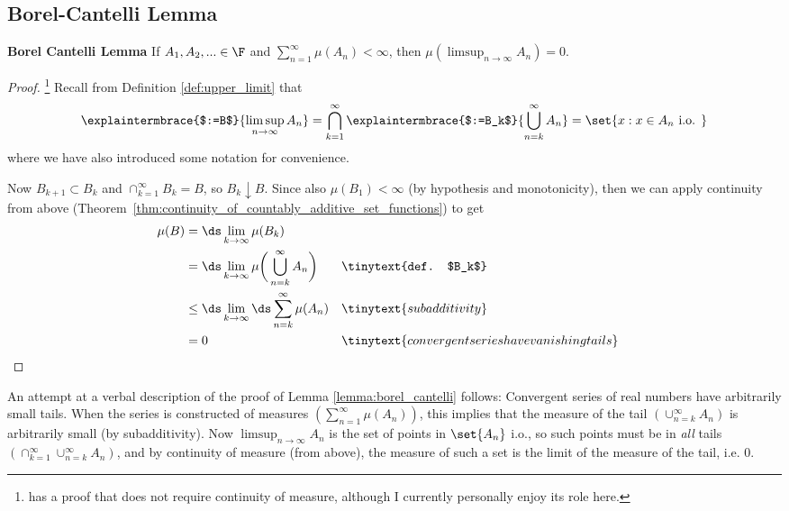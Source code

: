 \documentclass{article} %
\begin{document}
\subsection{Borel-Cantelli Lemma}

\begin{lemma}{\textbf{Borel Cantelli Lemma}}
If $A_1, A_2, ... \in \F$ and $\sum_{n=1}^\infty \mu(A_n) < \infty$, then $\mu(\limsup_{n \to \infty} A_n) = 0$.
\label{lemma:borel_cantelli}
\end{lemma}

\begin{proof}\footnote{\cite{ash2000probability} has a proof that does not require continuity of measure, although I currently personally enjoy its role here.}
Recall from Definition \ref{def:upper_limit} that
\[ \explaintermbrace{$:=B$}{\limsup_{n \to \infty} A_n} = \bigcap_{k=1}^\infty \explaintermbrace{$:=B_k$}{\bigcup_{n=k}^\infty A_n} = \set{x : x \in A_n \text{ i.o. }}  \]	
where we have also introduced some notation for convenience.

Now $B_{k+1} \subset B_k$ and $\cap_{k=1}^\infty B_k =B$, so $B_k \downarrow B$.  Since also $\mu(B_1) < \infty$ (by hypothesis and monotonicity), then we can apply continuity from above (Theorem~\ref{thm:continuity_of_countably_additive_set_functions}) to get
\begin{align*}
\mu(B) &= \ds\lim_{k \to \infty} \mu(B_k) \\
&= 	\ds\lim_{k \to \infty} \mu \bigg( \bigcup_{n=k}^\infty A_n \bigg) && \tinytext{def. $B_k$} \\
&\leq \ds\lim_{k \to \infty} \ds\sum_{n=k}^\infty \mu (A_n) && \tinytext{subadditivity} \\
&=0 && \tinytext{convergent series have vanishing tails}
\end{align*}
  
\end{proof}

\begin{remark}{}
An attempt at a verbal description of the proof of Lemma \ref{lemma:borel_cantelli} follows:  Convergent series of real numbers have arbitrarily small tails. When the series is constructed of measures $(\sum_{n=1}^\infty \mu(A_n))$, this implies that the measure of the tail $(\cup_{n=k}^\infty A_n)$ is arbitrarily small (by subadditivity).  Now $\limsup_{n \to \infty} A_n$ is the set of points in $\set{A_n}$ i.o., so such points must be in \textit{all} tails $(\cap_{k=1}^\infty \cup_{n=k}^\infty A_n)$, and by continuity of measure (from above), the measure of such a set is the limit of the measure of the tail, i.e. 0.
\end{remark}
\end{document}
